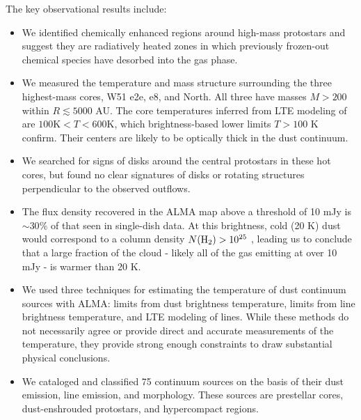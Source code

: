 \documentclass{emulateapj}
\begin{document}
The key observational results include:
\begin{itemize}
    \item We identified chemically enhanced regions around high-mass protostars
        and suggest they are radiatively heated zones in which previously
        frozen-out chemical species have desorbed into the gas phase.
    \item We measured the temperature and mass structure surrounding the three
        highest-mass cores, W51 e2e, e8, and North.  All three have masses
        $M>200$ \msun within $R\lesssim5000$ AU.  The core temperatures
        inferred from LTE modeling of \methanol are $100 \mathrm{K} < T < 600
        \mathrm{K}$, which brightness-based lower limits $T>100$ K confirm.
        Their centers are likely to be optically thick in the dust continuum.
    \item We searched for signs of disks around the central protostars in these
        hot cores, but found no clear signatures of disks or rotating
        structures perpendicular to the observed outflows.
    \item The flux density recovered in the ALMA map above a threshold of 10
        mJy \perbeam is $\sim30\%$ of that seen in single-dish data.  At this
        brightness, cold (20 K) dust would correspond to a column density
        $N(\textrm{H}_{2})>10^{25}$ \persc, leading us to conclude that a large fraction
        of the cloud - likely all of the gas emitting at over 10 mJy \perbeam -
        is warmer than 20 K.
    \item We used three techniques for estimating the temperature of
        dust continuum sources with ALMA: limits from dust brightness
        temperature, limits from line brightness temperature, and LTE modeling
        of \methanol lines.  While these methods do not necessarily agree
        or provide direct and accurate measurements of the temperature, they
        provide strong enough constraints to draw substantial physical conclusions.
    \item We cataloged and classified 75 continuum sources on the basis of their
        dust emission, line emission, and morphology.  These sources are
        prestellar cores, dust-enshrouded protostars, and hypercompact \hii
        regions.
\end{itemize}
\end{document}
